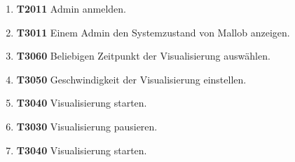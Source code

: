 \begin{enumerate}
    \item \textbf{T2011} Admin anmelden.
    
    \item \textbf{T3011} Einem Admin den Systemzustand von Mallob anzeigen.
    
    \item \textbf{T3060} Beliebigen Zeitpunkt der Visualisierung auswählen.
    
    \item \textbf{T3050} Geschwindigkeit der Visualisierung einstellen.
    
    \item \textbf{T3040} Visualisierung starten. 
    
    \item \textbf{T3030} Visualisierung pausieren.

    \item \textbf{T3040} Visualisierung starten.
\end{enumerate}



	